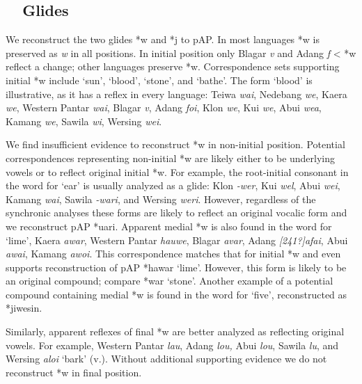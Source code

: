 \subsection[\ \ Glides]{\ \ Glides}
\hypertarget{RefHeading49925871885726}{}We reconstruct the two glides *w and *j to pAP. In most languages *w is preserved as \textit{w} in all positions. In initial position only Blagar \textit{v} and Adang \textit{f} {\textless} *w reflect a change; other languages preserve *w. Correspondence sets supporting initial *w include {\textquoteleft}sun{\textquoteright}, {\textquoteleft}blood{\textquoteright}, {\textquoteleft}stone{\textquoteright}, and {\textquoteleft}bathe{\textquoteright}. The form {\textquoteleft}blood{\textquoteright} is illustrative, as it has a reflex in every language: Teiwa \textit{wai}, Nedebang \textit{we}, Kaera \textit{we}, Western Pantar \textit{wai}, Blagar \textit{v{\textepsilon}}, Adang \textit{foi}, Klon \textit{we{\textglotstop}}, Kui \textit{we}, Abui \textit{wea}, Kamang \textit{we{\textlengthmark}}, Sawila \textit{wi{\textlengthmark}}, Wersing \textit{wei}.

We find insufficient evidence to reconstruct *w in non-initial position. Potential correspondences representing non-initial *w are likely either to be underlying vowels or to reflect original initial *w. For example, the root-initial consonant in the word for {\textquoteleft}ear{\textquoteright} is usually analyzed as a glide: Klon \textit{{}-wer}, Kui \textit{wel}, Abui \textit{wei}, Kamang \textit{wai}, Sawila \textit{{}-wari}, and Wersing \textit{weri}. However, regardless of the synchronic analyses these forms are likely to reflect an original vocalic form and we reconstruct pAP *uari. Apparent medial *w is also found in the word for {\textquoteleft}lime{\textquoteright}, Kaera \textit{awar}, Western Pantar \textit{hauwe}, Blagar \textit{avar}, Adang\textit{ [241?]afai}, Abui \textit{awai}, Kamang \textit{awoi}. This correspondence matches that for initial *w and even supports reconstruction of pAP *hawar {\textquoteleft}lime{\textquoteright}. However, this form is likely to be an original compound; 
compare *war {\textquoteleft}stone{\textquoteright}. Another example of a potential compound containing medial *w is found in the word for {\textquoteleft}five{\textquoteright}, reconstructed as *jiwesin.

Similarly, apparent reflexes of final *w are better analyzed as reflecting original vowels. For example, Western Pantar \textit{lau}, Adang \textit{lou,} Abui \textit{lou}, Sawila \textit{lu}, and Wersing \textit{aloi} {\textquoteleft}bark{\textquoteright} (v.). Without additional supporting evidence we do not reconstruct *w in final position.

